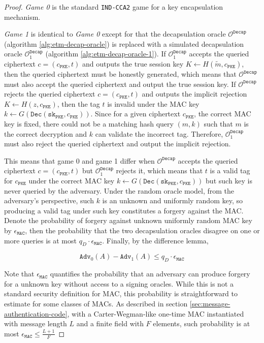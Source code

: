 \documentclass[floatrow,journal=tches,submission]{iacrtrans}
\newcommand{\pke}{\texttt{PKE}}
\newcommand{\decrypt}{\texttt{Dec}}
\newcommand{\decap}{\texttt{Decap}}
\newcommand{\mac}{\texttt{MAC}}
\newcommand{\sk}{\texttt{sk}}
\begin{document}
\begin{proof}
    \emph{Game 0} is the standard \texttt{IND-CCA2} game for a key encapsulation mechanism.

    \emph{Game 1} is identical to \emph{Game 0} except for that the decapsulation oracle $\mathcal{O}^\decap$ (algorithm \ref{alg:etm-decap-oracle}) is replaced with a simulated decapsulation oracle $\mathcal{O}^\decap_1$ (algorithm \ref{alg:etm-decap-oracle-1}). If $\mathcal{O}^\decap_1$ accepts the queried ciphertext $c = (c_\pke, t)$ and outputs the true session key $K \leftarrow H(\tilde{m}, c_\pke)$, then the queried ciphertext must be honestly generated, which means that $\mathcal{O}^\decap$ must also accept the queried ciphertext and output the true session key. If $\mathcal{O}^\decap$ rejects the queried ciphertext $c = (c_\pke, t)$ and outputs the implicit rejection $K \leftarrow H(z, c_\pke)$, then the tag $t$ is invalid under the MAC key $k \leftarrow G(\decrypt(\sk_\pke, c_\pke))$. Since for a given ciphertext $c_\pke$, the correct MAC key is fixed, there could not be a matching hash query $(m, k)$ such that $m$ is the correct decryption and $k$ can validate the incorrect tag. Therefore, $\mathcal{O}^\decap_1$ must also reject the queried ciphertext and output the implicit rejection.

    This means that game 0 and game 1 differ when $\mathcal{O}^\decap$ accepts the queried ciphertext $c = (c_\pke, t)$ but $\mathcal{O}^\decap_1$ rejects it, which means that $t$ is a valid tag for $c_\pke$ under the correct MAC key $k \leftarrow G(\decrypt(\sk_\pke, c_\pke))$ but such key is never queried by the adversary. Under the random oracle model, from the adversary's perspective, such $k$ is an unknown and uniformly random key, so producing a valid tag under such key constitutes a forgery against the MAC. Denote the probability of forgery against unknown uniformly random MAC key by $\epsilon_\mac$, then the probability that the two decapsulation oracles disagree on one or more queries is at most $q_D \cdot \epsilon_\mac$. Finally, by the difference lemma,

    \begin{equation*}
        \texttt{Adv}_0(A) - \texttt{Adv}_1(A) \leq q_D \cdot \epsilon_\mac
    \end{equation*}

    Note that $\epsilon_\mac$ quantifies the probability that an adversary can produce forgery for a unknown key without access to a signing oracles. While this is not a standard security definition for MAC, this probability is straightforward to estimate for some classes of MACs. As described in section \ref{sec:message-authentication-code}, with a Carter-Wegman-like one-time MAC instantiated with message length $L$ and a finite field with $F$ elements, such probability is at most $\epsilon_\mac \leq \frac{L+1}{F}$


\end{proof}
\end{document}
